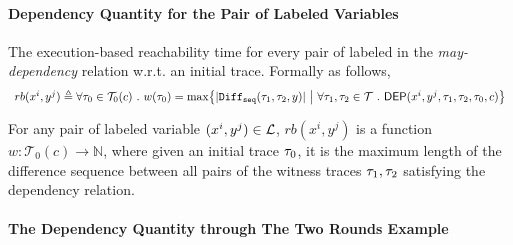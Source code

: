 \paragraph{Dependency Quantity for the Pair of Labeled Variables}
%
\begin{defn}
  \label{def:adapt-depvar_reachability}
  The execution-based reachability time for every pair of 
  labeled in the
  \emph{may-dependency} relation w.r.t. an initial trace. Formally as follows,
    \[
    \begin{array}{l}
        rb(x^i, y^j) \triangleq 
\forall \trace_0 \in \mathcal{T}_0(c) \sthat
  w (\trace_0) = \max \left\{ | \sdiff(\trace_1, \trace_2, y)|
  ~\middle\vert~
  \forall \trace_1, \trace_2 \in \mathcal{T} \sthat \dep(x^i, y^j,\trace_1, \trace_2, \trace_0, c) \right\}
\end{array}
\]
\end{defn}
%
For any pair of labeled variable $(x^i, y^j) \in \mathcal{L}$, 
$ rb(x^i, y^j)$ is a function $w: \mathcal{T}_0(c) \to \mathbb{N}$,
    where given an initial trace $\mathtt{\tau}_0$,
    it is the maximum length of the difference sequence between all pairs of the witness traces $\mathtt{\tau}_1, \mathtt{\tau}_2$ 
    satisfying the dependency relation.

\paragraph*{The Dependency Quantity through The Two Rounds Example}
